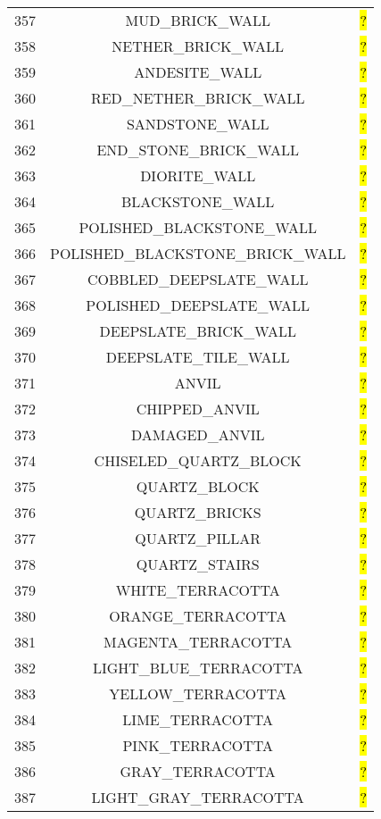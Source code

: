 \documentclass[11pt]{article}
\newcommand\myworries[1]{\sethlcolor{red}\hl{#1}}
\begin{document}
\begin{longtable}{ |c|c|c| }
357 & MUD\_BRICK\_WALL & \myworries{?} \\
358 & NETHER\_BRICK\_WALL & \myworries{?} \\
359 & ANDESITE\_WALL & \myworries{?} \\
360 & RED\_NETHER\_BRICK\_WALL & \myworries{?} \\
361 & SANDSTONE\_WALL & \myworries{?} \\
362 & END\_STONE\_BRICK\_WALL & \myworries{?} \\
363 & DIORITE\_WALL & \myworries{?} \\
364 & BLACKSTONE\_WALL & \myworries{?} \\
365 & POLISHED\_BLACKSTONE\_WALL & \myworries{?} \\
366 & POLISHED\_BLACKSTONE\_BRICK\_WALL & \myworries{?} \\
367 & COBBLED\_DEEPSLATE\_WALL & \myworries{?} \\
368 & POLISHED\_DEEPSLATE\_WALL & \myworries{?} \\
369 & DEEPSLATE\_BRICK\_WALL & \myworries{?} \\
370 & DEEPSLATE\_TILE\_WALL & \myworries{?} \\
371 & ANVIL & \myworries{?} \\
372 & CHIPPED\_ANVIL & \myworries{?} \\
373 & DAMAGED\_ANVIL & \myworries{?} \\
374 & CHISELED\_QUARTZ\_BLOCK & \myworries{?} \\
375 & QUARTZ\_BLOCK & \myworries{?} \\
376 & QUARTZ\_BRICKS & \myworries{?} \\
377 & QUARTZ\_PILLAR & \myworries{?} \\
378 & QUARTZ\_STAIRS & \myworries{?} \\
379 & WHITE\_TERRACOTTA & \myworries{?} \\
380 & ORANGE\_TERRACOTTA & \myworries{?} \\
381 & MAGENTA\_TERRACOTTA & \myworries{?} \\
382 & LIGHT\_BLUE\_TERRACOTTA & \myworries{?} \\
383 & YELLOW\_TERRACOTTA & \myworries{?} \\
384 & LIME\_TERRACOTTA & \myworries{?} \\
385 & PINK\_TERRACOTTA & \myworries{?} \\
386 & GRAY\_TERRACOTTA & \myworries{?} \\
387 & LIGHT\_GRAY\_TERRACOTTA & \myworries{?} \\

\end{longtable}
\end{document}
